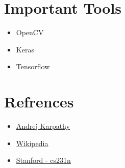 \documentclass{article}
\begin{document}

	\section{Important Tools}
	\begin{itemize}
		\item OpenCV
		\item Keras
		\item Tensorflow
	\end{itemize}
	
	\section{Refrences}
		\begin{itemize}
			\item \href{https://www.youtube.com/watch?v=u6aEYuemt0M\&t=524s}{Andrej Karpathy}
			\item \href{https://en.wikipedia.org/wiki/Computer_vision}{Wikipedia}
			\item \href{https://cs231n.github.io/}{Stanford - cs231n}
		\end{itemize}
\end{document}
